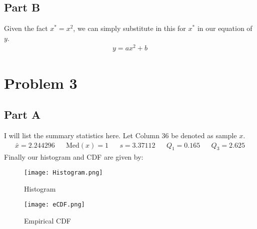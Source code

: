 \documentclass{article}
\begin{document}
\subsection*{Part B}
Given the fact $x^* = x^2$, we can simply substitute in this for $x^*$ in our equation of $y$.
\begin{align*}
\boxed{ y = a x^2 + b }
\end{align*}
\clearpage

\section*{Problem 3}
\subsection*{Part A}
I will list the summary statistics here. Let Column 36 be denoted as sample $x$.
\begin{align*}
\bar{x} = 2.244296 && \text{Med}(x) = 1 && s = 3.37112 && Q_1 = 0.165 && Q_3 = 2.625
\end{align*}
Finally our histogram and CDF are given by:
\begin{figure}[hbt!]
\centering
\texttt{[image: Histogram.png]}
\caption{Histogram}
\end{figure}
\begin{figure}[hbt!]
\centering
\texttt{[image: eCDF.png]}
\caption{Empirical CDF}
\end{figure}
\end{document}
